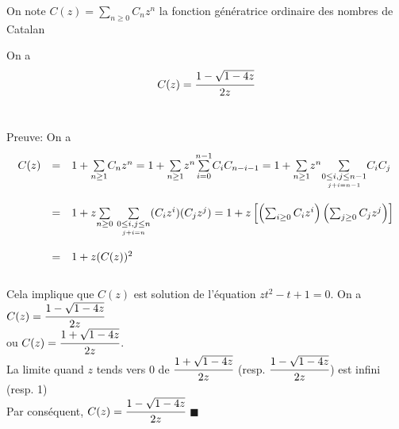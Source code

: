 On note $C(z)=\underset{n\geq 0}{\sum}C_{n}z^{n}$ la fonction génératrice ordinaire des nombres de Catalan
\begin{proposition}
	\begin{rm}
		On a \[C(z)=\cfrac{1-
				\sqrt{1-4z}}{2z}\]\\
	\end{rm}
\end{proposition}
Preuve: On a\\\[
	\begin{array}{r r l}
		C(z) & =       & 1+\underset{n\geq1}{\sum}C_{n}z^n = 1+ \underset{n\geq1}{\sum}z^{n}\underset{i=0}{\overset{n-1}{\sum}}C_{i}C_{n-i-1} = 1+
		\underset{n\geq1}{\sum}z^n\underset{\underset{j+i=n-1}{0\leq i, j \leq n-1}}{\sum}C_{i}C_{j}                                               \\
		     & \text{} &                                                                                                                           \\
		     & =       & 1+z\underset{n\geq0}{\sum}\text{ }\underset{\underset{j+i=n}{0\leq i, j \leq n}}{\sum}(C_{i}z^i)(C_{j}z^j)
		= 1 +z\left[\left(\sum_{i\geq0}C_{i}z^i\right)\left(\sum_{j\geq0}C_{j}z^j\right)\right]                                                    \\
		     & \text{} &                                                                                                                           \\
		     & =       & 1+z(C(z))^2
	\end{array}
\]\\
Cela implique que $C(z)$ est solution de l'équation $zt^2-t+1 = 0$. On a $C(z)=\cfrac{1-\sqrt{1-4z}}{2z}$\\ ou $C(z)=\cfrac{1+\sqrt{1-4z}}{2z}$.\\
La limite quand $z$ tends vers $0$ de $\cfrac{1+\sqrt{1-4z}}{2z}$ (resp. $\cfrac{1-\sqrt{1-4z}}{2z}$) est infini (resp. 1) \\
Par conséquent, $C(z)=\cfrac{1-\sqrt{1-4z}}{2z}$ \hspace{5pt}$\blacksquare$

